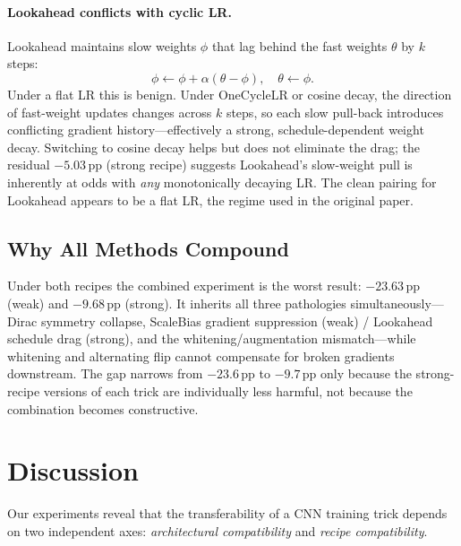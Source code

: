 \documentclass[10pt,twocolumn]{article}
\newcommand{\pp}{\,pp}   %
\begin{document}
\paragraph{Lookahead conflicts with cyclic LR.}
Lookahead maintains slow weights $\phi$ that lag behind the fast weights $\theta$ by $k$ steps:
\begin{equation}
    \phi \leftarrow \phi + \alpha(\theta - \phi), \quad \theta \leftarrow \phi.
\end{equation}
Under a flat LR this is benign. Under OneCycleLR or cosine decay, the direction of fast-weight updates changes across $k$ steps, so each slow pull-back introduces conflicting gradient history---effectively a strong, schedule-dependent weight decay.
Switching to cosine decay helps but does not eliminate the drag; the residual $-5.03$\pp{} (strong recipe) suggests Lookahead's slow-weight pull is inherently at odds with \emph{any} monotonically decaying LR.
The clean pairing for Lookahead appears to be a flat LR, the regime used in the original paper.

\subsection{Why All Methods Compound}
Under both recipes the combined experiment is the worst result: $-23.63$\pp{} (weak) and $-9.68$\pp{} (strong).
It inherits all three pathologies simultaneously---Dirac symmetry collapse, ScaleBias gradient suppression (weak) / Lookahead schedule drag (strong), and the whitening/augmentation mismatch---while whitening and alternating flip cannot compensate for broken gradients downstream.
The gap narrows from $-23.6$\pp{} to $-9.7$\pp{} only because the strong-recipe versions of each trick are individually less harmful, not because the combination becomes constructive.

\section{Discussion}\label{sec:discussion}

Our experiments reveal that the transferability of a CNN training trick depends on two independent axes: \emph{architectural compatibility} and \emph{recipe compatibility}.
\end{document}
